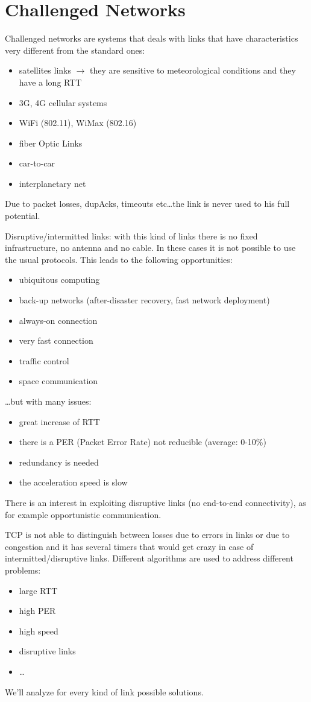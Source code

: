 \section{Challenged Networks}

Challenged networks are systems that deals with links that have
characteristics very different from the standard ones:

\begin{itemize}
\item satellites links $\to$ they are sensitive to meteorological conditions
  and they have a long RTT
\item 3G, 4G cellular systems
\item WiFi (802.11), WiMax (802.16)
\item fiber Optic Links
\item car-to-car
\item interplanetary net
\end{itemize}

Due to packet losses, dupAcks, timeouts etc\dots the link is never used
to his full potential.

Disruptive/intermitted links: with this kind of links there is no fixed
infrastructure, no antenna and no cable.
In these cases it is not possible to use the usual protocols.
This leads to the following opportunities:
\begin{itemize}
\item ubiquitous computing
\item back-up networks (after-disaster recovery, fast network deployment)
\item always-on connection
\item very fast connection
\item traffic control
\item space communication
\end{itemize}
\dots but with many issues:
\begin{itemize}
\item great increase of RTT
\item there is a PER (Packet Error Rate) not reducible (average: 0-10\%)
\item redundancy is needed
\item the acceleration speed is slow
\end{itemize}
There is an interest in exploiting disruptive links (no end-to-end
connectivity), as for example opportunistic communication.

TCP is not able to distinguish between losses due to errors in links or due
to congestion and it has several timers that would get crazy in case of
intermitted/disruptive links.
Different algorithms are used to address different problems:
\begin{itemize}
\item large RTT
\item high PER
\item high speed
\item disruptive links
\item \dots
\end{itemize}
We'll analyze for every kind of link possible solutions.


